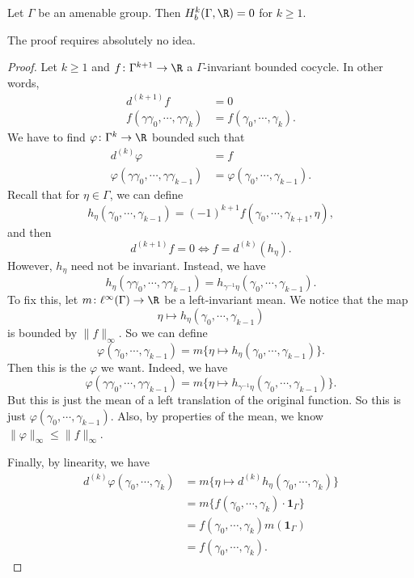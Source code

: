 \documentclass[a4paper]{article}
\begin{document}
\begin{prop}
  Let $\Gamma$ be an amenable group. Then $H^k_b(\Gamma, \R) = 0$ for $k \geq 1$.
\end{prop}

The proof requires absolutely no idea.
\begin{proof}
  Let $k \geq 1$ and $f\colon \Gamma^{k + 1} \to \R$ a $\Gamma$-invariant bounded cocycle. In other words,
  \begin{align*}
    d^{(k + 1)} f &= 0\\
    f(\gamma\gamma_0, \cdots, \gamma\gamma_k) &= f(\gamma_0, \cdots, \gamma_k).
  \end{align*}
  We have to find $\varphi\colon \Gamma^k \to \R$ bounded such that
  \begin{align*}
    d^{(k)} \varphi &= f\\
    \varphi(\gamma\gamma_0, \cdots, \gamma\gamma_{k - 1}) &= \varphi(\gamma_0, \cdots, \gamma_{k - 1}).
  \end{align*}
  Recall that for $\eta \in \Gamma$, we can define
  \[
    h_\eta (\gamma_0, \cdots, \gamma_{k - 1}) = (-1)^{k + 1} f(\gamma_0, \cdots, \gamma_{k + 1}, \eta),
  \]
  and then
  \[
    d^{(k + 1)}f = 0 \Longleftrightarrow f = d^{(k)}(h_\eta).
  \]
  However, $h_\eta$ need not be invariant. Instead, we have
  \[
    h_\eta(\gamma\gamma_0, \cdots, \gamma\gamma_{k - 1}) = h_{\gamma^{-1} \eta} (\gamma_0, \cdots, \gamma_{k - 1}).
  \]
  To fix this, let $m \colon \ell^\infty(\Gamma) \to \R$ be a left-invariant mean. We notice that the map
  \[
    \eta \mapsto h_\eta (\gamma_0, \cdots, \gamma_{k - 1})
  \]
  is bounded by $\|f\|_\infty$. So we can define
  \[
    \varphi(\gamma_0, \cdots, \gamma_{k - 1}) = m \Big\{ \eta \mapsto h_\eta (\gamma_0, \cdots, \gamma_{k - 1})\Big\}.
  \]
  Then this is the $\varphi$ we want. Indeed, we have
  \[
    \varphi(\gamma \gamma_0, \cdots, \gamma \gamma_{k - 1}) = m \Big\{ \eta \mapsto h_{\gamma^{-1}\eta} (\gamma_0, \cdots, \gamma_{k - 1})\Big\}.
  \]
  But this is just the mean of a left translation of the original function. So this is just $\varphi(\gamma_0, \cdots, \gamma_{k - 1})$. Also, by properties of the mean, we know $\|\varphi\|_\infty \leq \|f\|_\infty$.

  Finally, by linearity, we have
  \begin{align*}
    d^{(k)} \varphi(\gamma_0, \cdots, \gamma_k) &= m \Big\{ \eta \mapsto d^{(k)} h_\eta (\gamma_0, \cdots, \gamma_k) \Big\}\\
    &= m \Big\{ f(\gamma_0, \cdots, \gamma_k) \cdot \mathbf{1}_\Gamma\Big\}\\
    &= f(\gamma_0, \cdots, \gamma_k) m (\mathbf{1}_\Gamma)\\
    &= f(\gamma_0, \cdots, \gamma_k).
  \end{align*}
\end{proof}
\end{document}

